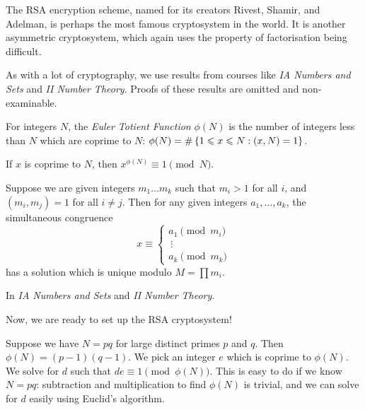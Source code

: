 \documentclass{article}
\begin{document}
The RSA encryption scheme, named for its creators Rivest, Shamir, and Adelman, is perhaps the most famous cryptosystem in the world. It is another asymmetric cryptosystem, which again uses the property of factorisation being difficult.

\begin{note}
	As with a lot of cryptography, we use results from courses like \textit{IA Numbers and Sets} and \textit{II Number Theory}. Proofs of these results are omitted and non-examinable.
\end{note}

\begin{definition}
    For integers $N$, the \textit{Euler Totient Function} $\phi(N)$ is the number of integers less than $N$ which are coprime to $N$: $\phi(N) = \#\left\lbrace 1 \leqslant x \leqslant N : (x, N) = 1 \right\rbrace$.
\end{definition}
 
\begin{theorem}
	\label{euler-fermat-theorem}
    If $x$ is coprime to $N$, then $x^{\phi(N)} \equiv 1 \pmod N$.
\end{theorem}

\begin{theorem}
	\label{chinese-remainder-theorem}
	Suppose we are given integers $m_1 \ldots m_k$ such that $m_i > 1$ for all $i$, and  $(m_i, m_j) = 1$ for all $i \neq j$. Then for any given integers $a_1, \ldots, a_k$, the simultaneous congruence
	\[
	x \equiv \begin{cases}
		a_1 \pmod{m_i} \\
		\ \vdots \\
		a_k \pmod{m_k}
	\end{cases}
	\]
	has a solution which is unique modulo $M = \prod m_i$.
\end{theorem}

\begin{prf}
    In \textit{IA Numbers and Sets} and \textit{II Number Theory}.
\end{prf}

Now, we are ready to set up the RSA cryptosystem!

Suppose we have $N = pq$ for large distinct primes $p$ and $q$. Then $\phi(N) = (p-1)(q-1)$. We pick an integer $e$ which is coprime to $\phi(N)$. We solve for $d$ such that $de \equiv 1 \pmod{\phi(N)}$. This is easy to do if we know $N = pq$: subtraction and multiplication to find $\phi(N)$ is trivial, and we can solve for $d$ easily using Euclid's algorithm.
\end{document}
